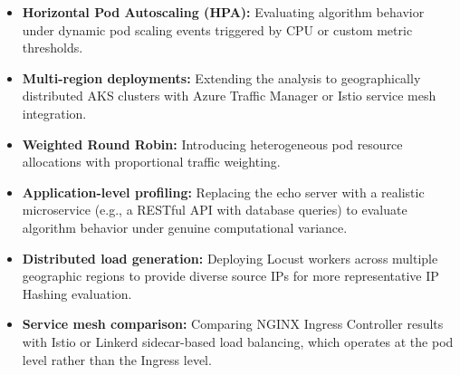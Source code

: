 \documentclass[conference]{IEEEtran}
\begin{document}
\begin{itemize}
    \item \textbf{Horizontal Pod Autoscaling (HPA):} Evaluating algorithm behavior under dynamic pod scaling events triggered by CPU or custom metric thresholds.
    \item \textbf{Multi-region deployments:} Extending the analysis to geographically distributed AKS clusters with Azure Traffic Manager or Istio service mesh integration.
    \item \textbf{Weighted Round Robin:} Introducing heterogeneous pod resource allocations with proportional traffic weighting.
    \item \textbf{Application-level profiling:} Replacing the echo server with a realistic microservice (e.g., a RESTful API with database queries) to evaluate algorithm behavior under genuine computational variance.
    \item \textbf{Distributed load generation:} Deploying Locust workers across multiple geographic regions to provide diverse source IPs for more representative IP Hashing evaluation.
    \item \textbf{Service mesh comparison:} Comparing NGINX Ingress Controller results with Istio or Linkerd sidecar-based load balancing, which operates at the pod level rather than the Ingress level.
\end{itemize}
\end{document}
